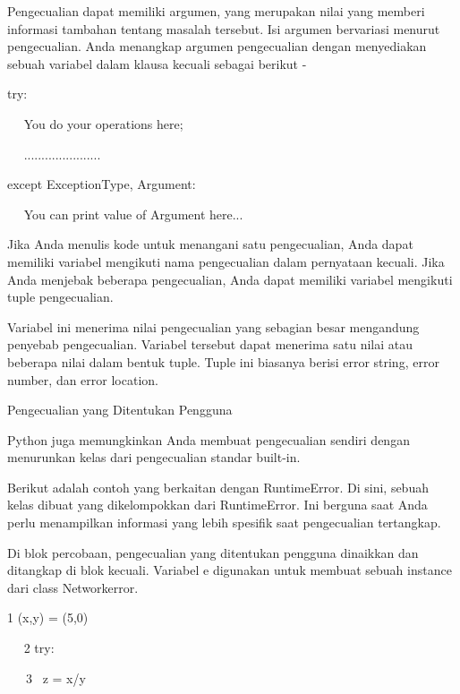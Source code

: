 Pengecualian dapat memiliki argumen, yang merupakan nilai yang memberi informasi tambahan tentang masalah tersebut. Isi argumen bervariasi menurut pengecualian. Anda menangkap argumen pengecualian dengan menyediakan sebuah variabel dalam klausa kecuali sebagai berikut - \par
\vspace{12pt}
try: \par
~~ You do your operations here; \par
~~ ...................... \par
except ExceptionType, Argument: \par
~~ You can print value of Argument here... \par
\vspace{12pt}
Jika Anda menulis kode untuk menangani satu pengecualian, Anda dapat memiliki variabel mengikuti nama pengecualian dalam pernyataan kecuali. Jika Anda menjebak beberapa pengecualian, Anda dapat memiliki variabel mengikuti tuple pengecualian. \par
\vspace{12pt}
Variabel ini menerima nilai pengecualian yang sebagian besar mengandung penyebab pengecualian. Variabel tersebut dapat menerima satu nilai atau beberapa nilai dalam bentuk tuple. Tuple ini biasanya berisi error string, error number, dan error location. \par
\vspace{12pt}
Pengecualian yang Ditentukan Pengguna \par
\vspace{12pt}
Python juga memungkinkan Anda membuat pengecualian sendiri dengan menurunkan kelas dari pengecualian standar built-in. \par
\vspace{12pt}
Berikut adalah contoh yang berkaitan dengan RuntimeError. Di sini, sebuah kelas dibuat yang dikelompokkan dari RuntimeError. Ini berguna saat Anda perlu menampilkan informasi yang lebih spesifik saat pengecualian tertangkap. \par
\vspace{12pt}
Di blok percobaan, pengecualian yang ditentukan pengguna dinaikkan dan ditangkap di blok kecuali. Variabel e digunakan untuk membuat sebuah instance dari class Networkerror. \par
\vspace{12pt}
1 (x,y) = (5,0) \par
~~ 2 try: \par
~~~3~  z = x/y \par

